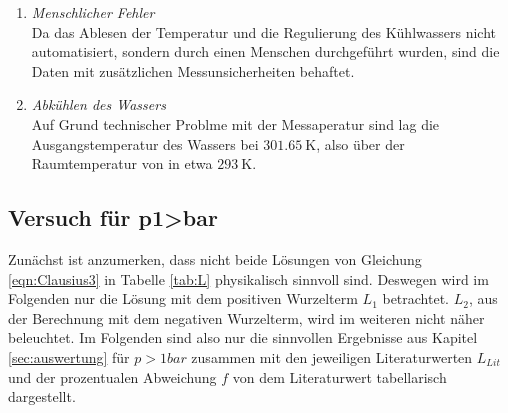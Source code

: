 \begin{enumerate}
  \item \textit{Menschlicher Fehler}\\
    Da das Ablesen der Temperatur und die Regulierung des Kühlwassers nicht automatisiert, sondern durch
    einen Menschen durchgeführt wurden, sind die Daten mit zusätzlichen Messunsicherheiten behaftet.
  \item \textit{Abkühlen des Wassers}\\
    Auf Grund technischer Problme mit der Messaperatur sind lag die Ausgangstemperatur des Wassers
    bei $\SI{301.65}{\kelvin}$, also über der Raumtemperatur von in etwa $\SI{293}{\kelvin}$.
\end{enumerate}

\subsection{Versuch für p1>bar}
Zunächst ist anzumerken, dass nicht beide Lösungen von Gleichung \ref{eqn:Clausius3} in Tabelle \ref{tab:L}
physikalisch sinnvoll sind. Deswegen wird im Folgenden nur die Lösung mit dem positiven Wurzelterm $L_1$
betrachtet. $L_2$, aus der Berechnung mit dem negativen Wurzelterm, wird im weiteren nicht näher beleuchtet.
Im Folgenden sind also nur die sinnvollen Ergebnisse aus Kapitel \ref{sec:auswertung} für $p>1bar$ zusammen 
mit den jeweiligen Literaturwerten $L_{Lit}$ und der prozentualen Abweichung $f$ von dem Literaturwert 
tabellarisch dargestellt.
